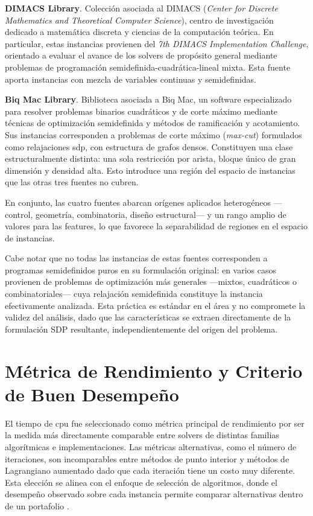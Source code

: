 \textbf{DIMACS Library}\cite{DIMACSLibraryMixeda}. Colección asociada al DIMACS
(\textit{Center for Discrete Mathematics and Theoretical Computer Science}), centro de investigación
dedicado a matemática discreta y ciencias de la computación teórica. En particular, estas instancias
provienen del \textit{7th DIMACS Implementation Challenge}, orientado a evaluar el avance de los solvers
de propósito general mediante problemas de programación semidefinida-cuadrática-lineal mixta. Esta fuente
aporta instancias con mezcla de variables continuas y semidefinidas.

\textbf{Biq Mac Library}\cite{BiqMacLibrarya}. Biblioteca asociada a Biq Mac, un software especializado
para resolver problemas binarios cuadráticos y de corte máximo mediante técnicas de optimización semidefinida
y métodos de ramificación y acotamiento. Sus instancias corresponden a problemas de corte máximo
(\textit{max-cut}) formulados como relajaciones \acrshort{sdp}, con estructura de grafos densos.
Constituyen una clase estructuralmente distinta: una sola restricción por arista, bloque único de gran
dimensión y densidad alta. Esto introduce una región del espacio de instancias que las otras tres fuentes
no cubren.

En conjunto, las cuatro fuentes abarcan orígenes aplicados heterogéneos ---control, geometría, combinatoria, diseño
estructural--- y un rango amplio de valores para las features, lo que favorece la separabilidad de regiones
en el espacio de instancias.

Cabe notar que no todas las instancias de estas fuentes corresponden a programas semidefinidos puros en su formulación
original: en varios casos provienen de problemas de optimización más generales ---mixtos, cuadráticos o combinatoriales---
cuya relajación semidefinida constituye la instancia efectivamente analizada. Esta práctica es estándar en el área y no
compromete la validez del análisis, dado que las características se extraen directamente de la formulación SDP
resultante, independientemente del origen del problema.

\section{Métrica de Rendimiento y Criterio de Buen Desempeño}
\label{sec:metrica}

El tiempo de \acrshort{cpu} fue seleccionado como métrica principal de rendimiento por ser la medida más directamente comparable entre solvers de
distintas familias algorítmicas e implementaciones. Las métricas alternativas, como el número de iteraciones, son incomparables entre métodos de
punto interior y métodos de Lagrangiano aumentado dado que cada iteración tiene un costo muy diferente. Esta elección se alinea con el enfoque
de selección de algoritmos, donde el desempeño observado sobre cada instancia permite comparar alternativas dentro de un portafolio
\cite{riceAlgorithmSelectionProblem1976}.

